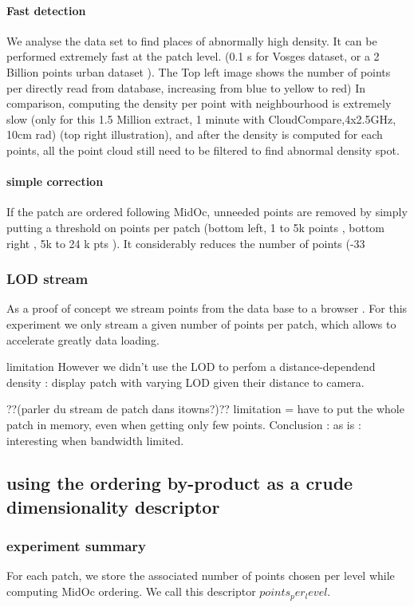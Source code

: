 			\paragraph{Fast detection}
				We analyse the data set to find places of abnormally high density.
				It can be performed extremely fast at the patch level. (0.1 s for Vosges dataset, or a 2 Billion points urban dataset ). 
				The Top left image shows the number of points per \cubic \meter directly read from database, increasing from blue to yellow to red)
				In comparison, computing the density per point with neighbourhood is extremely slow (only for this 1.5 Million extract, 1 minute with CloudCompare,4x2.5GHz, 10cm rad) (top right illustration), and after the density is computed for each points, all the point cloud still need to be filtered to find abnormal density spot.
			
			\paragraph{simple correction}
				If the patch are ordered following MidOc, unneeded points are removed by simply putting a threshold on points per patch (bottom left, 1 to 5k points \per \cubic \meter , bottom right , 5k to 24 k pts \per \cubic \meter). It considerably reduces the number of points (-33%
			
				
		\subsubsection{LOD stream}
			As a proof of concept we stream points from the data base to a browser .
			For this experiment we only stream a given number of points per patch, which allows to accelerate greatly data loading.
			
			
			limitation
			However we didn't use the LOD to perfom a distance-dependend density :  display patch with varying LOD given their distance to camera.
			
			??(parler du stream de patch dans itowns?)??
			limitation = have to put the whole patch in memory, even when getting only few points.
			Conclusion : as is : interesting when bandwidth limited.  
			
			
	\subsection{using the ordering by-product as a crude dimensionality descriptor}
		\subsubsection{experiment summary}
			For each patch, we store the associated number of points chosen per level while computing MidOc ordering. We call this descriptor $points_per_level$.
			
